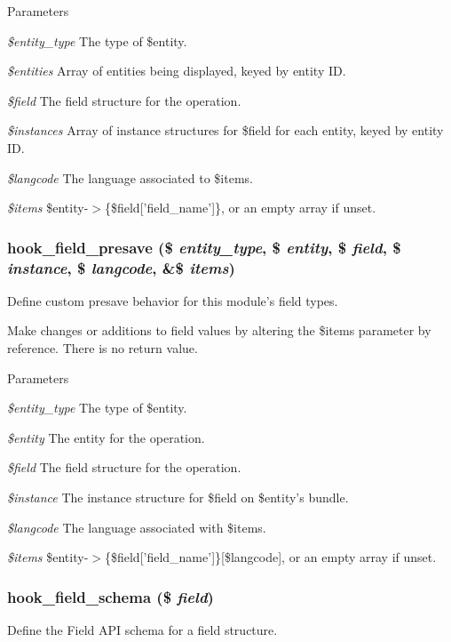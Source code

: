 \begin{DoxyParams}{Parameters}
\item[{\em \$entity\_\-type}]The type of \$entity. \item[{\em \$entities}]Array of entities being displayed, keyed by entity ID. \item[{\em \$field}]The field structure for the operation. \item[{\em \$instances}]Array of instance structures for \$field for each entity, keyed by entity ID. \item[{\em \$langcode}]The language associated to \$items. \item[{\em \$items}]\$entity-\/$>$\{\$field\mbox{[}'field\_\-name'\mbox{]}\}, or an empty array if unset. \end{DoxyParams}
\hypertarget{group__field__types_ga5ab3a9e3c8ebccb8ca151790ec07809d}{
\subsubsection[{hook\_\-field\_\-presave}]{\setlength{\rightskip}{0pt plus 5cm}hook\_\-field\_\-presave (\$ {\em entity\_\-type}, \/  \$ {\em entity}, \/  \$ {\em field}, \/  \$ {\em instance}, \/  \$ {\em langcode}, \/  \&\$ {\em items})}}
\label{group__field__types_ga5ab3a9e3c8ebccb8ca151790ec07809d}
Define custom presave behavior for this module's field types.

Make changes or additions to field values by altering the \$items parameter by reference. There is no return value.


\begin{DoxyParams}{Parameters}
\item[{\em \$entity\_\-type}]The type of \$entity. \item[{\em \$entity}]The entity for the operation. \item[{\em \$field}]The field structure for the operation. \item[{\em \$instance}]The instance structure for \$field on \$entity's bundle. \item[{\em \$langcode}]The language associated with \$items. \item[{\em \$items}]\$entity-\/$>$\{\$field\mbox{[}'field\_\-name'\mbox{]}\}\mbox{[}\$langcode\mbox{]}, or an empty array if unset. \end{DoxyParams}
\hypertarget{group__field__types_gaae7d9348e56f207a8be0b866d25252b7}{
\subsubsection[{hook\_\-field\_\-schema}]{\setlength{\rightskip}{0pt plus 5cm}hook\_\-field\_\-schema (\$ {\em field})}}
\label{group__field__types_gaae7d9348e56f207a8be0b866d25252b7}
Define the Field API schema for a field structure.

